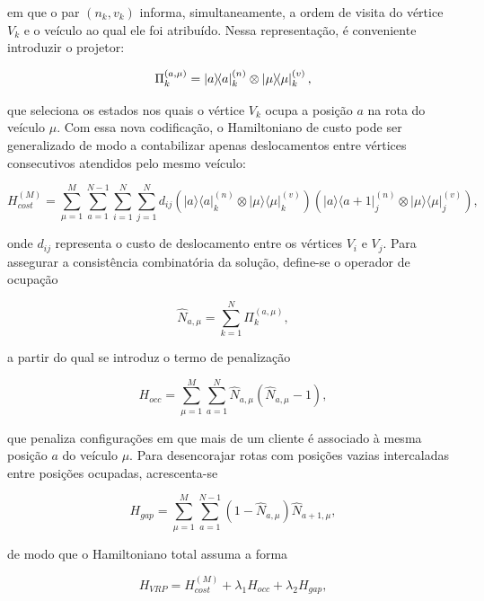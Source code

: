\noindent em que o par $(n_k, v_k)$ informa, simultaneamente, a ordem de visita do vértice $V_k$ e o veículo ao qual ele foi atribuído. Nessa representação, é conveniente introduzir o projetor:

\begin{equation}
    \Pi^{(a,\mu)}_k = \ketbra{a}{a}_k^{(n)}\otimes \ketbra{\mu}{\mu}_k^{(v)},
\end{equation}

\noindent que seleciona os estados nos quais o vértice $V_k$ ocupa a posição $a$ na rota do veículo $\mu$. Com essa nova codificação, o Hamiltoniano de custo pode ser generalizado de modo a contabilizar apenas deslocamentos entre vértices consecutivos atendidos pelo mesmo veículo:

\begin{equation}
H^{(M)}_{cost} = \sum_{\mu=1}^{M} \sum_{a=1}^{N-1} \sum_{i=1}^{N} 
\sum_{j=1}^{N} d_{ij} \left(|a\rangle \langle a|^{(n)}_k \otimes 
|\mu\rangle \langle \mu|^{(v)}_k\right) \left(|a\rangle \langle 
a+1|^{(n)}_j \otimes |\mu\rangle \langle \mu|^{(v)}_j\right),
\end{equation}

\noindent onde $d_{ij}$ representa o custo de deslocamento entre os vértices $V_i$ e $V_j$. Para assegurar a consistência combinatória da solução, define-se o operador de ocupação

\begin{equation}
\hat{N}_{a,\mu} = \sum_{k=1}^{N} \Pi^{(a,\mu)}_k,
\end{equation}

\noindent a partir do qual se introduz o termo de penalização

\begin{equation}
H_{occ} = \sum_{\mu=1}^{M} \sum_{a=1}^{N} \hat{N}_{a,\mu} 
\left(\hat{N}_{a,\mu} - 1\right),
\end{equation}

\noindent que penaliza configurações em que mais de um cliente é associado à mesma posição $a$ do veículo $\mu$. Para desencorajar rotas com posições vazias intercaladas entre posições ocupadas, acrescenta-se

\begin{equation}
H_{gap} = \sum_{\mu=1}^{M} \sum_{a=1}^{N-1} \left(1 - 
\hat{N}_{a,\mu}\right)\hat{N}_{a+1,\mu},
\end{equation}

\noindent de modo que o Hamiltoniano total assuma a forma

\begin{equation}
H_{VRP} = H^{(M)}_{cost} + \lambda_1 H_{occ} + \lambda_2 H_{gap},
\end{equation}

